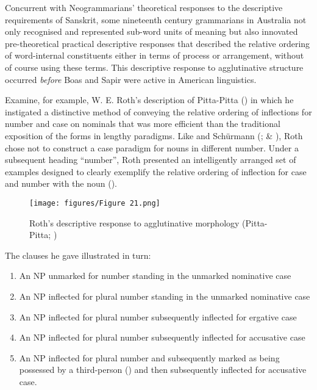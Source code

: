 Concurrent with Neogrammarians' theoretical responses to the descriptive requirements of Sanskrit, some nineteenth century grammarians in Australia not only recognised and represented sub-word units of meaning but also innovated pre-theoretical practical descriptive responses that described the relative ordering of word-internal constituents either in terms of process or arrangement, without of course using these terms. This descriptive response to agglutinative structure occurred \textit{before} Boas and Sapir were active in American linguistics. 

Examine, for example, W. E. Roth’s description of Pitta-Pitta (\citeyear[8]{roth_ethnological_1897}) in which he instigated a distinctive method of conveying the relative ordering of inflections for number and case on nominals that was more efficient than the traditional exposition of the forms in lengthy paradigms. Like \citet{meyer_vocabulary_1843} and Schürmann (\citeyear{schurmann_vocabulary_1844};  \& ), Roth chose not to construct a case paradigm for nouns in different number. Under a subsequent heading “number'', Roth presented an intelligently arranged set of examples designed to clearly exemplify the relative ordering of inflection for case and number with the noun ().

\begin{figure}
\texttt{[image: figures/Figure 21.png]}
\caption{Roth’s descriptive response to agglutinative morphology (Pitta-Pitta; \citealt[8]{roth_ethnological_1897})}
\label{fig:2:21}
\end{figure} 

The clauses he gave illustrated in turn: 

\begin{enumerate}
    \item An NP unmarked for number standing in the unmarked nominative case
    \item An NP inflected for plural number standing in the unmarked nominative case
    \item An NP inflected for plural number subsequently inflected for ergative case
    \item An NP inflected for plural number subsequently inflected for accusative case
    \item An NP inflected for plural number and subsequently marked as being possessed by a third-person (\citealt[200]{blake_pitta_1979}) and then subsequently inflected for accusative case.
\end{enumerate}

